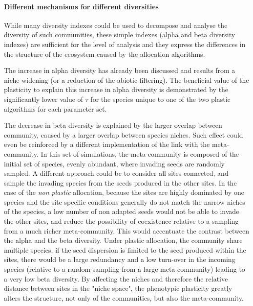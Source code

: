 \paragraph{Different mechanisms for different diversities}


While many diversity indexes could be used to decompose and analyse the diversity of such communities, these simple indexes (alpha and beta diversity indexes) are sufficient for the level of analysis and they express the differences in the structure of the ecosystem caused by the allocation algorithms.

The increase in alpha diversity has already been discussed and results from a niche widening (or a reduction of the abiotic filtering). The beneficial value of the plasticity to explain this increase in alpha diversity is demonstrated by the significantly lower value of $\tau$ for the species unique to one of the two plastic algorithms for each parameter set. 

The decrease in beta diversity is explained by the larger overlap between community, caused by a larger overlap between species niches. Such effect could even be reinforced by a different implementation of the link with the meta-community. In this set of simulations, the meta-community is composed of the initial set of species, evenly abundant, where invading seeds are randomly sampled. A different approach could be to consider all sites connected, and sample the invading species from the seeds produced in the other sites. In the case of the \textit{non plastic } allocation, because the sites are highly dominated by one species and the site specific conditions generally do not match the narrow niches of the species, a low number of non adapted seeds would not be able to invade the other sites, and reduce the possibility of coexistence relative to a sampling from a much richer meta-community. This would accentuate the contrast between the alpha and the beta diversity. Under plastic allocation, the community share multiple species, if the seed dispersion is limited to the seed produced within the sites, there would be a large redundancy and a low turn-over in the incoming species (relative to a random sampling from a large meta-community) leading to a very low beta diversity. By affecting the niches and therefore the relative distance between sites in the "niche space", the phenotypic plasticity greatly alters the structure, not only of the communities, but also the meta-community.

